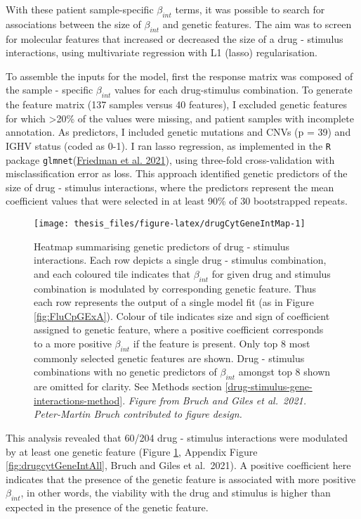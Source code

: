 \documentclass[11pt, a4paper, twosided]{book}
\begin{document}
With these patient sample-specific \(\beta_{int}\) terms, it was possible to search for associations between the size of \(\beta_{int}\) and genetic features. The aim was to screen for molecular features that increased or decreased the size of a drug - stimulus interactions, using multivariate regression with L1 (lasso) regularisation.

To assemble the inputs for the model, first the response matrix was composed of the sample - specific \(\beta_{int}\) values for each drug-stimulus combination. To generate the feature matrix (137 samples versus 40 features), I excluded genetic features for which \textgreater20\% of the values were missing, and patient samples with incomplete annotation. As predictors, I included genetic mutations and CNVs (p = 39) and IGHV status (coded as 0-1). I ran lasso regression, as implemented in the \texttt{R} package \texttt{glmnet}(\protect\hyperlink{ref-R-glmnet}{Friedman et al. 2021}), using three-fold cross-validation with misclassification error as loss. This approach identified genetic predictors of the size of drug - stimulus interactions, where the predictors represent the mean coefficient values that were selected in at least 90\% of 30 bootstrapped repeats.


\begin{figure}[hp]

{\centering \texttt{[image: thesis\_files/figure-latex/drugCytGeneIntMap-1]} 

}

\caption{Heatmap summarising genetic predictors of drug - stimulus interactions. Each row depicts a single drug - stimulus combination, and each coloured tile indicates that \(\beta_{int}\) for given drug and stimulus combination is modulated by corresponding genetic feature. Thus each row represents the output of a single model fit (as in Figure \ref{fig:FluCpGExA}). Colour of tile indicates size and sign of coefficient assigned to genetic feature, where a positive coefficient corresponds to a more positive \(\beta_{int}\) if the feature is present. Only top 8 most commonly selected genetic features are shown. Drug - stimulus combinations with no genetic predictors of \(\beta_{int}\) amongst top 8 shown are omitted for clarity. See Methods section \ref{drug-stimulus-gene-interactions-method}. \emph{Figure from Bruch and Giles et al.~2021. Peter-Martin Bruch contributed to figure design.}}\label{fig:drugCytGeneIntMap}
\end{figure}
This analysis revealed that 60/204 drug - stimulus interactions were modulated by at least one genetic feature (Figure \ref{fig:drugCytGeneIntMap}, Appendix Figure \ref{fig:drugcytGeneIntAll}, Bruch and Giles et al.~2021). A positive coefficient here indicates that the presence of the genetic feature is associated with more positive \(\beta_{int}\), in other words, the viability with the drug and stimulus is higher than expected in the presence of the genetic feature.
\end{document}

